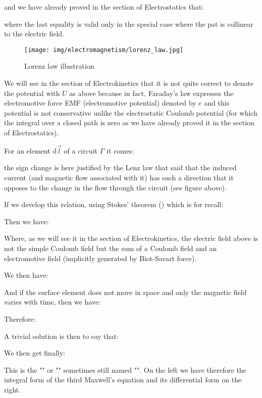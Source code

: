 	and we have already proved in the section of Electrostatics that:
	
	where the last equality is valid only in the special case where the pat is collinear to the electric field.
	\begin{figure}[H]
		\centering
		\texttt{[image: img/electromagnetism/lorenz\_law.jpg]}
		\caption{Lorenz law illustration}
	\end{figure}
	\begin{tcolorbox}[title=Remark,colframe=black,arc=10pt]
	We will see in the section of Electrokinetics that it is not quite correct to denote the potential with $U$ as above because in fact, Faraday's law expresses the electromotive force EMF (electromotive potential) denoted by $e$ and this potential is not conservative unlike the electrostatic Coulomb potential (for which the integral over a closed path is zero as we have already proved it in the section of Electrostatics).
	\end{tcolorbox}
	For an element $\mathrm{d}\vec{l}$ of a circuit $\Gamma$ it comes:
	
	the sign change is here justified by the Lenz law that said that the induced current (and magnetic flow associated with it) has such a direction that it opposes to the change in the flow through the circuit (see figure above).
	
	If we develop this relation, using Stokes' theorem () which is for recall:
	
	Then we have:
	
	Where, as we will see it in the section of Electrokinetics, the electric field above is not the simple Coulomb field but the sum of a Coulomb field and an electromotive field (implicitly generated by Biot-Savart force).
	
	We then have:
	
	And if the surface element does not move in space and only the magnetic field varies with time, then we have:
	
	Therefore:
	
	A trivial solution is then to say that:
	
	We then get finally:
	
	This is the "" or "" sometimes still named "". On the left we have therefore the integral form of the third Maxwell's equation and its differential form on the right.
	
